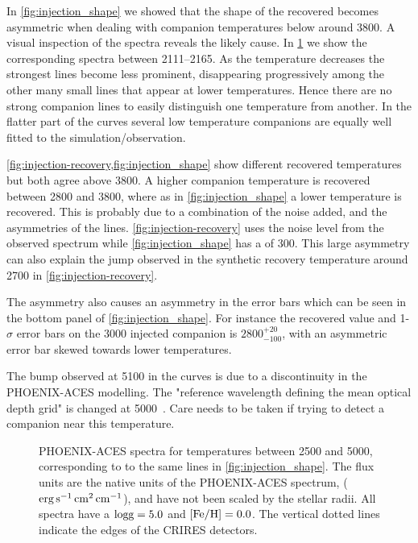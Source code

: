 In \cref{fig:injection_shape} we showed that the shape of the recovered \textchisquared{} becomes asymmetric when dealing with companion temperatures below around 3800\K{}.
A visual inspection of the spectra reveals the likely cause.
In \cref{fig:comp_spectra} we show the corresponding spectra between 2111--2165\nm{}.
As the temperature decreases the strongest lines become less prominent, disappearing progressively among the other many small lines that appear at lower temperatures.
Hence there are no strong companion lines to easily distinguish one temperature from another.
In the flatter part of the \textchisquared{} curves several low temperature companions are equally well fitted to the simulation/observation.

\cref{fig:injection-recovery,fig:injection_shape} show different recovered temperatures but both agree above 3800\K{}.
A higher companion temperature is recovered between 2800 and 3800\K{}, where as in \cref{fig:injection_shape} a lower temperature is recovered.
This is probably due to a combination of the noise added, and the asymmetries of the \textchisquared{} lines.
\cref{fig:injection-recovery} uses the noise level from the observed spectrum while \cref{fig:injection_shape} has a \snr{} of 300.
This large asymmetry can also explain the jump observed in the synthetic recovery temperature around 2700\K{} in \cref{fig:injection-recovery}.

The asymmetry also causes an asymmetry in the \textchisquared{} error bars which can be seen in the bottom panel of \cref{fig:injection_shape}.
For instance the recovered value and 1-\(\sigma\) error bars on the 3000\K{} injected companion is \(2800 ^{+20}_{-100}\), with an asymmetric error bar skewed towards lower temperatures.

The bump observed at 5100\K{} in the \textchisquared{} curves is due to a discontinuity in the {PHOENIX-ACES} modelling.
The "reference wavelength defining the mean optical depth grid" is changed at 5000\K{}~\citep[][Sect. 2.3]{husser_new_2013}.
Care needs to be taken if trying to detect a companion near this temperature.

\begin{figure}
    \centering
    \caption{{PHOENIX-ACES} spectra for temperatures between 2500 and 5000\K{}, corresponding to to the same lines in \cref{fig:injection_shape}.
The flux units are the native units of the {PHOENIX-ACES} spectrum, (\(\rm erg\,s^{-1}\,cm^{2}\,cm^{-1}\)), and have not been scaled by the stellar radii.
All spectra have a \(\rm \textrm{logg}{}=5.0\) and \(\rm \feh{}=0.0\).
The vertical dotted lines indicate the edges of the CRIRES detectors.}
    \label{fig:comp_spectra}
\end{figure}

